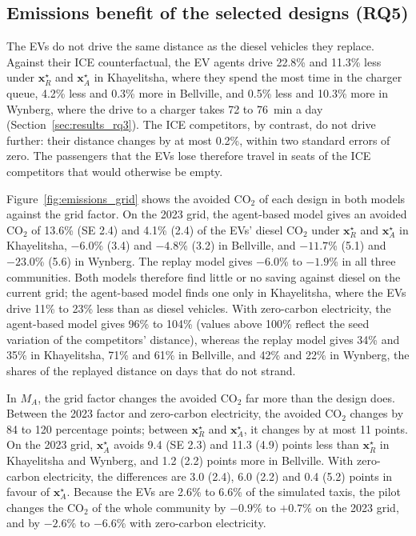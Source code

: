 \documentclass{elsarticle}
\newcommand{\MA}{\ensuremath{M_A}}
\newcommand{\xR}{\ensuremath{\mathbf{x}_R^{\star}}}
\newcommand{\xA}{\ensuremath{\mathbf{x}_A^{\star}}}
\begin{document}
\subsection{Emissions benefit of the selected designs (RQ5)}
\label{sec:results_rq5}

The EVs do not drive the same distance as the diesel vehicles they replace. Against their ICE counterfactual, the EV agents drive 22.8\% and 11.3\% less under \(\xR\) and \(\xA\) in Khayelitsha, where they spend the most time in the charger queue, 4.2\% less and 0.3\% more in Bellville, and 0.5\% less and 10.3\% more in Wynberg, where the drive to a charger takes 72 to 76~min a day (Section~\ref{sec:results_rq3}). The ICE competitors, by contrast, do not drive further: their distance changes by at most 0.2\%, within two standard errors of zero. The passengers that the EVs lose therefore travel in seats of the ICE competitors that would otherwise be empty.

Figure~\ref{fig:emissions_grid} shows the avoided CO$_2$ of each design in both models against the grid factor. On the 2023 grid, the agent-based model gives an avoided CO$_2$ of 13.6\% (SE 2.4) and 4.1\% (2.4) of the EVs' diesel CO$_2$ under \(\xR\) and \(\xA\) in Khayelitsha, $-6.0$\% (3.4) and $-4.8$\% (3.2) in Bellville, and $-11.7$\% (5.1) and $-23.0$\% (5.6) in Wynberg. The replay model gives $-6.0$\% to $-1.9$\% in all three communities. Both models therefore find little or no saving against diesel on the current grid; the agent-based model finds one only in Khayelitsha, where the EVs drive 11\% to 23\% less than as diesel vehicles. With zero-carbon electricity, the agent-based model gives 96\% to 104\% (values above 100\% reflect the seed variation of the competitors' distance), whereas the replay model gives 34\% and 35\% in Khayelitsha, 71\% and 61\% in Bellville, and 42\% and 22\% in Wynberg, the shares of the replayed distance on days that do not strand.

In \(\MA\), the grid factor changes the avoided CO$_2$ far more than the design does. Between the 2023 factor and zero-carbon electricity, the avoided CO$_2$ changes by 84 to 120 percentage points; between \(\xR\) and \(\xA\), it changes by at most 11 points. On the 2023 grid, \(\xA\) avoids 9.4 (SE 2.3) and 11.3 (4.9) points less than \(\xR\) in Khayelitsha and Wynberg, and 1.2 (2.2) points more in Bellville. With zero-carbon electricity, the differences are 3.0 (2.4), 6.0 (2.2) and 0.4 (5.2) points in favour of \(\xA\). Because the EVs are 2.6\% to 6.6\% of the simulated taxis, the pilot changes the CO$_2$ of the whole community by $-0.9$\% to $+0.7$\% on the 2023 grid, and by $-2.6$\% to $-6.6$\% with zero-carbon electricity.
\end{document}

